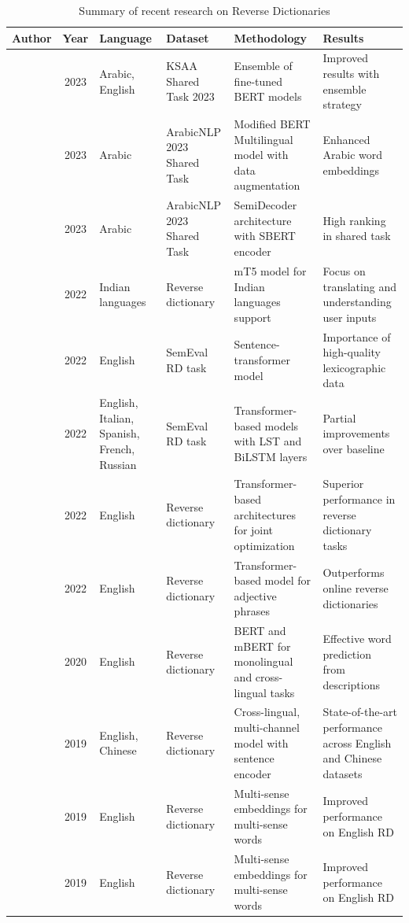 \documentclass[15pt]{article}
\begin{document}
\begin{table}
    \centering
    \caption{Summary of recent research on Reverse Dictionaries}
     \renewcommand{\arraystretch}{1.5}%
    \begin{tabularx}{\textwidth}{|c|c|X|X|X|X|}
        \hline
        \textbf{Author} & \textbf{Year} &  \textbf{Language} & \textbf{Dataset} & \textbf{Methodology} & \textbf{Results} \\
        \hline
        \cite{Albakry2023} & 2023 & Arabic, English & KSAA Shared Task 2023 & Ensemble of fine-tuned BERT models & Improved results with ensemble strategy \\
        \hline
        \cite{Qaddoumi2023} & 2023 & Arabic & ArabicNLP 2023 Shared Task & Modified BERT Multilingual model with data augmentation & Enhanced Arabic word embeddings \\
        \hline
        \cite{Sibaee2023} & 2023 & Arabic & ArabicNLP 2023 Shared Task & SemiDecoder architecture with SBERT encoder & High ranking in shared task \\
        \hline
        \cite{Mane2022} & 2022 & Indian languages & Reverse dictionary & mT5 model for Indian languages support & Focus on translating and understanding user inputs \\
        \hline
        \cite{Ardoiz2022} & 2022 & English & SemEval RD task & Sentence-transformer model & Importance of high-quality lexicographic data \\
        \hline
        \cite{Tran2022} & 2022 & English, Italian, Spanish, French, Russian & SemEval RD task & Transformer-based models with LST and BiLSTM layers & Partial improvements over baseline \\
        \hline
        \cite{Chen2022} & 2022 & English & Reverse dictionary & Transformer-based architectures for joint optimization & Superior performance in reverse dictionary tasks \\
        \hline
        \cite{Siddique2022} & 2022 & English & Reverse dictionary & Transformer-based model for adjective phrases & Outperforms online reverse dictionaries \\
        \hline
        \cite{Yan2020} & 2020 & English & Reverse dictionary & BERT and mBERT for monolingual and cross-lingual tasks & Effective word prediction from descriptions \\
        \hline
        \cite{Zhang2019} & 2019 & English, Chinese & Reverse dictionary & Cross-lingual, multi-channel model with sentence encoder & State-of-the-art performance across English and Chinese datasets \\
        \hline
        \cite{Pilehvar2019} & 2019 & English & Reverse dictionary & Multi-sense embeddings for multi-sense words & Improved performance on English RD \\
        \hline
        \cite{Hedderich2019} & 2019 & English & Reverse dictionary & Multi-sense embeddings for multi-sense words & Improved performance on English RD \\
        \hline
    \end{tabularx}
\end{table}
\end{document}
